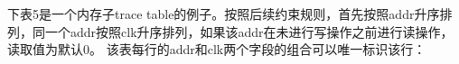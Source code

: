 下表5是一个内存子trace table的例子。按照后续约束规则，首先按照addr升序排列，同一个addr按照clk升序排列，如果该addr在未进行写操作之前进行读操作，读取值为默认0。
该表每行的addr和clk两个字段的组合可以唯一标识该行：

\begin{table}[!ht]
    \centering {}
    \caption{OlaVM的trace表例子}
    \label{table: olavm-trace-memory-table-example}
\end{table}